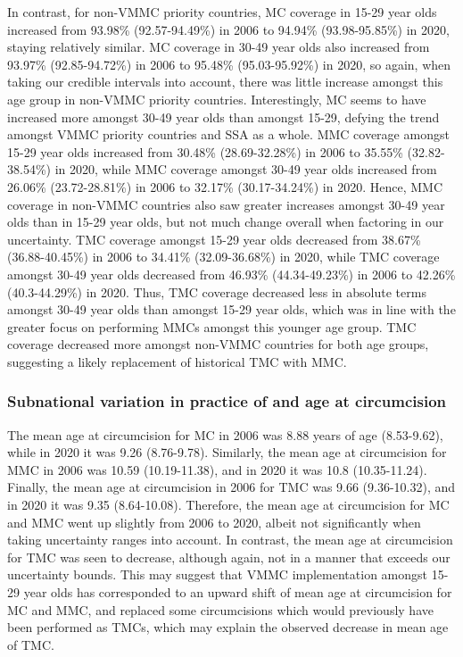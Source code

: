 \documentclass{article}
\begin{document}
In contrast, for non-VMMC priority countries, MC coverage in 15-29 year olds increased from 93.98\% (92.57-94.49\%) in 2006 to 94.94\% (93.98-95.85\%) in 2020, staying relatively similar. MC coverage in 30-49 year olds also increased from 93.97\% (92.85-94.72\%) in 2006 to 95.48\% (95.03-95.92\%) in 2020, so again, when taking our credible intervals into account, there was little increase amongst this age group in non-VMMC priority countries. Interestingly, MC seems to have increased more amongst 30-49 year olds than amongst 15-29, defying the trend amongst VMMC priority countries and SSA as a whole.  MMC coverage amongst 15-29 year olds increased from 30.48\% (28.69-32.28\%) in 2006 to 35.55\% (32.82-38.54\%) in 2020, while MMC coverage amongst 30-49 year olds increased from 26.06\% (23.72-28.81\%) in 2006 to 32.17\% (30.17-34.24\%) in 2020. Hence, MMC coverage in non-VMMC countries also saw greater increases amongst 30-49 year olds than in 15-29 year olds, but not much change overall when factoring in our uncertainty.  
TMC coverage amongst 15-29 year olds decreased from 38.67\% (36.88-40.45\%) in 2006 to 34.41\% (32.09-36.68\%) in 2020, while TMC coverage amongst 30-49 year olds decreased from 46.93\% (44.34-49.23\%) in 2006 to 42.26\% (40.3-44.29\%) in 2020. Thus, TMC coverage decreased less in absolute terms amongst 30-49 year olds than amongst 15-29 year olds, which was in line with the greater focus on performing MMCs amongst this younger age group. 
TMC coverage decreased more amongst non-VMMC countries for both age groups, suggesting a likely replacement of historical TMC with MMC.


\subsubsection*{Subnational variation in practice of and age at circumcision}


The mean age at circumcision for MC in 2006 was 8.88 years of age (8.53-9.62), while in 2020 it was 9.26 (8.76-9.78). Similarly, the mean age at circumcision for MMC in 2006 was 10.59 (10.19-11.38), and in 2020 it was 10.8 (10.35-11.24). Finally, the mean age at circumcision in 2006 for TMC was 9.66 (9.36-10.32), and in 2020 it was 9.35 (8.64-10.08). Therefore, the mean age at circumcision for MC and MMC went up slightly from 2006 to 2020, albeit not significantly when taking uncertainty ranges into account. In contrast, the mean age at circumcision for TMC was seen to decrease, although again, not in a manner that exceeds our uncertainty bounds. This may suggest that VMMC implementation amongst 15-29 year olds has corresponded to an upward shift of mean age at circumcision for MC and MMC, and replaced some circumcisions which would previously have been performed as TMCs, which may explain the observed decrease in mean age of TMC.
\end{document}
